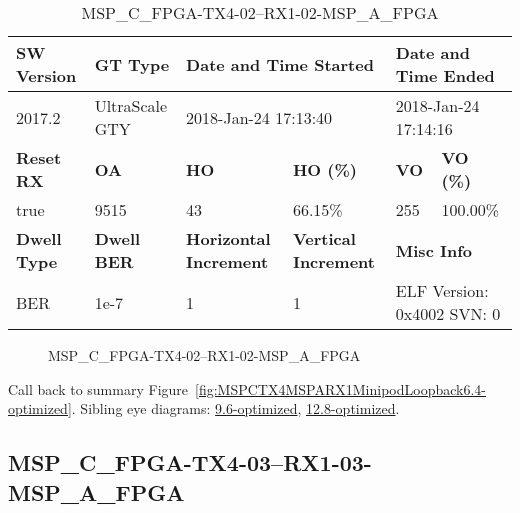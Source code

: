 \begin{table}[h]
\centering
\caption{MSP\_C\_FPGA-TX4-02--RX1-02-MSP\_A\_FPGA}
\label{tab:MSPCFPGATX402RX102MSPAFPGA6.4-optimized}
\begin{tabular}{@{}|l|l|l|l|l|l|@{}}
\toprule
\textbf{SW Version}                & \textbf{GT Type}   & \multicolumn{2}{l|}{\textbf{Date and Time Started}}            & \multicolumn{2}{l|}{\textbf{Date and Time Ended}}        \\ \midrule
2017.2                       & UltraScale GTY          & \multicolumn{2}{l|}{2018-Jan-24 17:13:40}                   & \multicolumn{2}{l|}{2018-Jan-24 17:14:16}               \\ \midrule
\textbf{Reset RX}                  & \textbf{OA} & \textbf{HO}   & \textbf{HO (\%)} & \textbf{VO} & \textbf{VO (\%)} \\ \midrule
true & 9515        & 43          & 66.15\%        & 255        & 100.00\%       \\ \midrule
\textbf{Dwell Type}                & \textbf{Dwell BER} & \textbf{Horizontal Increment} & \textbf{Vertical Increment}    & \multicolumn{2}{l|}{\textbf{Misc Info}}                  \\ \midrule
BER                            & 1e-7        & 1        & 1           & \multicolumn{2}{l|}{ELF Version: 0x4002 SVN: 0}                         \\ \bottomrule
\end{tabular}
\end{table}

\begin{figure}[h]
\caption{MSP\_C\_FPGA-TX4-02--RX1-02-MSP\_A\_FPGA} \label{fig:MSPCFPGATX402RX102MSPAFPGA6.4-optimized}
\end{figure}

Call back to summary Figure~\ref{fig:MSPCTX4MSPARX1MinipodLoopback6.4-optimized}.
Sibling eye diagrams: \hyperref[sec:MSPCFPGATX402RX102MSPAFPGA9.6-optimized]{9.6-optimized}, \hyperref[sec:MSPCFPGATX402RX102MSPAFPGA12.8-optimized]{12.8-optimized}.

\clearpage
\newpage


\subsection{MSP\_C\_FPGA-TX4-03--RX1-03-MSP\_A\_FPGA}\label{sec:MSPCFPGATX403RX103MSPAFPGA6.4-optimized}

